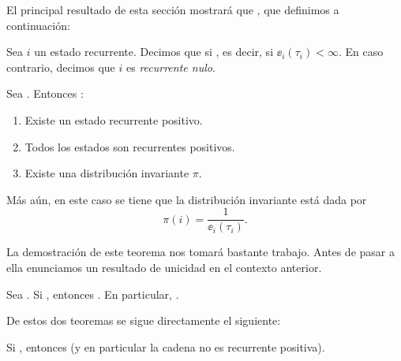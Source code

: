 El principal resultado de esta sección mostrará que  , que definimos a continuación:

\begin{defn}
Sea $i$ un estado recurrente.
Decimos que  si , es decir, si $\ee_i(\tau_i)<\infty$.
En caso contrario, decimos que $i$ es \emph{recurrente nulo}.
\end{defn}

\begin{thm}\label{thm:ex-inv}
Sea .
Entonces :
\begin{enumerate}[label=\uptext{(\roman*)}]
\item Existe un estado recurrente positivo.
\item Todos los estados son recurrentes positivos.
\item Existe una distribución invariante $\pi$.
\end{enumerate}
Más aún, en este caso se tiene que la distribución invariante está dada por
\begin{equation}
\pi(i)=\frac{1}{\ee_i(\tau_i)}.\label{eq:inv-form}
\end{equation}
\end{thm}

La demostración de este teorema nos tomará bastante trabajo.
Antes de pasar a ella enunciamos un resultado de unicidad en el contexto anterior.

\begin{thm}\label{thm:uniq-inv}
Sea .
Si , entonces .
En particular, .
\end{thm}

De estos dos teoremas se sigue directamente el siguiente:

\begin{cor}\label{cor:irrednorecpos}
Si , entonces  (y en particular la cadena no es recurrente positiva).
\end{cor}

